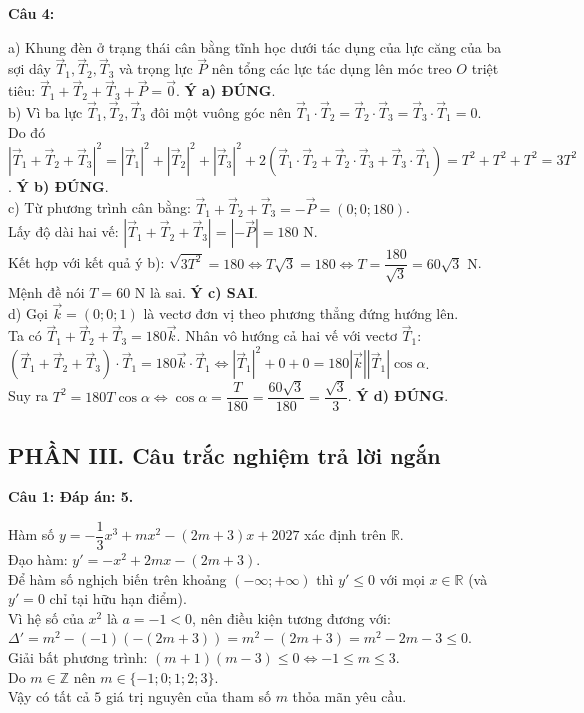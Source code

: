 \documentclass[12pt,a4paper]{article}
\newcommand{\loigiai}[1]{\par\medskip\Needspace{4\baselineskip}\noindent\textbf{#1}\par\nobreak}
\begin{document}
\loigiai{Câu 4:}
a) Khung đèn ở trạng thái cân bằng tĩnh học dưới tác dụng của lực căng của ba sợi dây $\vec{T}_1, \vec{T}_2, \vec{T}_3$ và trọng lực $\vec{P}$ nên tổng các lực tác dụng lên móc treo $O$ triệt tiêu: $\vec{T}_1+\vec{T}_2+\vec{T}_3+\vec{P}=\vec{0}$. \textbf{Ý a) ĐÚNG}.\\
b) Vì ba lực $\vec{T}_1, \vec{T}_2, \vec{T}_3$ đôi một vuông góc nên $\vec{T}_1\cdot\vec{T}_2=\vec{T}_2\cdot\vec{T}_3=\vec{T}_3\cdot\vec{T}_1=0$.\\
Do đó $|\vec{T}_1+\vec{T}_2+\vec{T}_3|^2=|\vec{T}_1|^2+|\vec{T}_2|^2+|\vec{T}_3|^2+2(\vec{T}_1\cdot\vec{T}_2+\vec{T}_2\cdot\vec{T}_3+\vec{T}_3\cdot\vec{T}_1)=T^2+T^2+T^2=3T^2$. \textbf{Ý b) ĐÚNG}.\\
c) Từ phương trình cân bằng: $\vec{T}_1+\vec{T}_2+\vec{T}_3=-\vec{P}=(0;0;180)$.\\
Lấy độ dài hai vế: $|\vec{T}_1+\vec{T}_2+\vec{T}_3|=|-\vec{P}|=180\text{ N}$.\\
Kết hợp với kết quả ý b): $\sqrt{3T^2}=180 \iff T\sqrt{3}=180 \iff T=\dfrac{180}{\sqrt{3}}=60\sqrt{3}\text{ N}$.\\
Mệnh đề nói $T=60\text{ N}$ là sai. \textbf{Ý c) SAI}.\\
d) Gọi $\vec{k}=(0;0;1)$ là vectơ đơn vị theo phương thẳng đứng hướng lên.\\
Ta có $\vec{T}_1+\vec{T}_2+\vec{T}_3=180\vec{k}$. Nhân vô hướng cả hai vế với vectơ $\vec{T}_1$:\\
$(\vec{T}_1+\vec{T}_2+\vec{T}_3)\cdot\vec{T}_1=180\vec{k}\cdot\vec{T}_1 \iff |\vec{T}_1|^2+0+0=180|\vec{k}||\vec{T}_1|\cos\alpha$.\\
Suy ra $T^2=180 T\cos\alpha \iff \cos\alpha=\dfrac{T}{180}=\dfrac{60\sqrt{3}}{180}=\dfrac{\sqrt{3}}{3}$. \textbf{Ý d) ĐÚNG}.

\subsection*{PHẦN III. Câu trắc nghiệm trả lời ngắn}

\loigiai{Câu 1: Đáp án: 5.}
Hàm số $y=-\dfrac{1}{3}x^3+mx^2-(2m+3)x+2027$ xác định trên $\mathbb{R}$.\\
Đạo hàm: $y'=-x^2+2mx-(2m+3)$.\\
Để hàm số nghịch biến trên khoảng $(-\infty;+\infty)$ thì $y'\le 0$ với mọi $x\in\mathbb{R}$ (và $y'=0$ chỉ tại hữu hạn điểm).\\
Vì hệ số của $x^2$ là $a=-1<0$, nên điều kiện tương đương với:\\
$\Delta'=m^2-(-1)(-(2m+3))=m^2-(2m+3)=m^2-2m-3\le 0$.\\
Giải bất phương trình: $(m+1)(m-3)\le 0 \iff -1\le m\le 3$.\\
Do $m\in\mathbb{Z}$ nên $m\in\{-1;0;1;2;3\}$.\\
Vậy có tất cả $5$ giá trị nguyên của tham số $m$ thỏa mãn yêu cầu.
\end{document}
